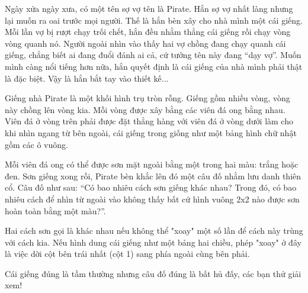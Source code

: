 Ngày xửa ngày xưa, có một tên sợ vợ tên là Pirate. Hắn sợ vợ nhất làng nhưng lại muốn ra oai trước mọi người. Thế là hắn bèn xây cho nhà mình một cái giếng. Mỗi lần vợ bị rượt chạy trối chết, hắn đều nhằm thẳng cái giếng rồi chạy vòng vòng quanh nó. Người ngoài nhìn vào thấy hai vợ chồng đang chạy quanh cái giếng, chẳng biết ai đang đuổi đánh ai cả, cứ tưởng tên này đang “dạy vợ”. Muốn mình càng nổi tiếng hơn nữa, hắn quyết định là cái giếng của nhà mình phải thật là đặc biệt. Vậy là hắn bắt tay vào thiết kế...

Giếng nhà Pirate là một khối hình trụ tròn rỗng. Giếng gồm nhiều vòng, vòng này chồng lên vòng kia. Mỗi vòng được xây bằng các viên đá ong bằng nhau. Viên đá ở vòng trên phải được đặt thẳng hàng với viên đá ở vòng dưới làm cho khi nhìn ngang từ bên ngoài, cái giếng trong giống như một bảng hình chữ nhật gồm các ô vuông. 

Mỗi viên đá ong có thể được sơn mặt ngoài bằng một trong hai màu: trắng hoặc đen. Sơn giếng xong rồi, Pirate bèn khắc lên đó một câu đố nhằm lưu danh thiên cổ. Câu đố như sau: “Có bao nhiêu cách sơn giếng khác nhau? Trong đó, có bao nhiêu cách để nhìn từ ngoài vào không thấy bất cứ hình vuông 2x2 nào được sơn hoàn toàn bằng một màu?”.

Hai cách sơn gọi là khác nhau nếu không thể "xoay" một số lần để cách này trùng với cách kia. Nếu hình dung cái giếng như một bảng hai chiều, phép "xoay" ở đây là việc dời cột bên trái nhất (cột 1) sang phía ngoài cùng bên phải.

Cái giếng đúng là tầm thường nhưng câu đố đúng là bất hủ đấy, các bạn thử giải xem!